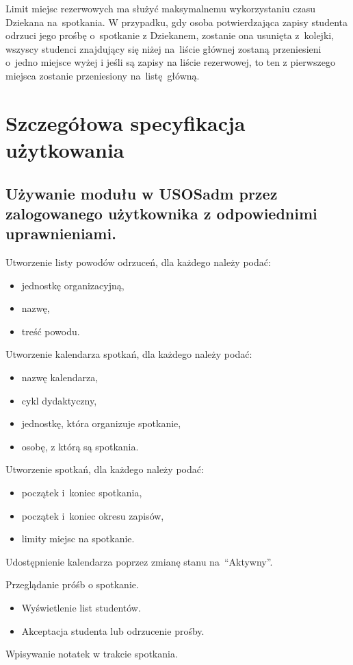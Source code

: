 \documentclass[licencjacka]{pracamgr}
\begin{document}
Limit miejsc rezerwowych ma służyć maksymalnemu wykorzystaniu czasu Dziekana na~spotkania. W przypadku, gdy osoba potwierdzająca zapisy studenta odrzuci jego prośbę o~spotkanie z Dziekanem, zostanie ona usunięta z~kolejki, wszyscy studenci znajdujący się niżej na~liście głównej zostaną przeniesieni o~jedno miejsce wyżej i jeśli są zapisy na liście rezerwowej, to ten z pierwszego miejsca zostanie przeniesiony na~listę~główną.

\section{Szczegółowa specyfikacja użytkowania}

\subsection{Używanie modułu w USOSadm przez zalogowanego użytkownika z odpowiednimi uprawnieniami.}
	\begin{step}
			\item Utworzenie listy powodów odrzuceń, dla każdego należy podać:
					\begin{itemize}
						\item jednostkę organizacyjną,
						\item nazwę,
						\item treść powodu.
					\end{itemize}
			\item Utworzenie kalendarza spotkań, dla każdego należy podać:
					\begin{itemize}
						\item nazwę kalendarza,
						\item cykl dydaktyczny,
						\item jednostkę, która organizuje spotkanie,
						\item osobę, z którą są spotkania.
					\end{itemize} 
				\item Utworzenie spotkań, dla każdego należy podać:
					\begin{itemize}
						\item początek i~koniec spotkania,
						\item początek i~koniec okresu zapisów,
						\item limity miejsc na spotkanie.
					\end{itemize}
		\item Udostępnienie kalendarza poprzez zmianę stanu na~\enquote{Aktywny}.
		\item Przeglądanie próśb o spotkanie.
			\begin{itemize}
				\item Wyświetlenie list studentów.
				\item Akceptacja studenta lub odrzucenie prośby.
			\end{itemize}
		\item Wpisywanie notatek w trakcie spotkania.
	\end{step}
	
\end{document}
